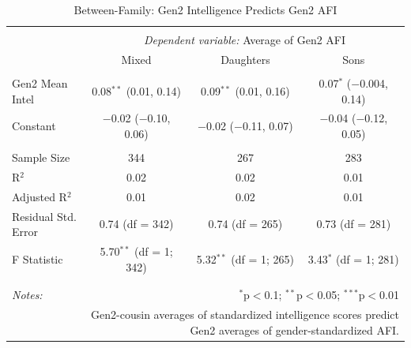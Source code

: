 \documentclass[a4paper,man,apacite,natbib,12pt,longtable]{apa6}\usepackage[]{graphicx}\usepackage[]{color}
\begin{document}
\begin{landscape}
\begin{longtable}{@{\extracolsep{5pt}}lccc} 
\caption{Between-Family: Gen2 Intelligence Predicts Gen2 AFI}\label{table_Mean_Child_Intelligence_Mean_Child_AFI_9}
\\[-1.8ex]\hline 
\hline \\[-3.8ex] 
& \multicolumn{3}{c}{\textit{Dependent variable:} Average of Gen2 AFI} \\ 
\cline{2-4}
 & Mixed & Daughters & Sons \\ 
\hline \\[-1.8ex] 
 Gen2 Mean Intel & 0.08$^{**}$ (0.01, 0.14) & 0.09$^{**}$ (0.01, 0.16) & 0.07$^{*}$ ($-$0.004, 0.14) \\ 
  Constant & $-$0.02 ($-$0.10, 0.06) & $-$0.02 ($-$0.11, 0.07) & $-$0.04 ($-$0.12, 0.05) \\ 
 \hline \\[-1.8ex] 
Sample Size & 344 & 267 & 283 \\ 
R$^{2}$ & 0.02 & 0.02 & 0.01 \\ 
Adjusted R$^{2}$ & 0.01 & 0.02 & 0.01 \\ 
Residual Std. Error & 0.74 (df = 342) & 0.74 (df = 265) & 0.73 (df = 281) \\ 
F Statistic & 5.70$^{**}$ (df = 1; 342) & 5.32$^{**}$ (df = 1; 265) & 3.43$^{*}$ (df = 1; 281) \\ 
\hline 
\hline \\[-1.8ex] \\[-7ex]
\textit{Notes:}  & \multicolumn{3}{r}{$^{*}$p$<$0.1; $^{**}$p$<$0.05; $^{***}$p$<$0.01} \\[2ex]
& \multicolumn{3}{r}{\parbox{.6\linewidth}{\footnotesize Gen2-cousin averages of standardized intelligence scores predict Gen2 averages of gender-standardized AFI.}} \\ 
\end{longtable}\pagebreak


\end{landscape}
\end{document}

